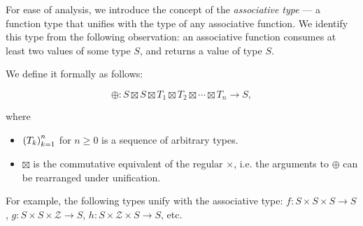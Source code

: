 For ease of analysis, we introduce the concept of the \emph{associative type}
--- a function type that unifies with the type of any associative function. We
identify this type from the following observation: an associative function
consumes at least two values of some type $S$, and returns a value of type $S$.

We define it formally as follows:

\[\oplus:S \boxtimes S \boxtimes T_1 \boxtimes T_2 \boxtimes \cdots \boxtimes
T_n \rightarrow S, \]

where

\begin{itemize}

\item $\left({T_k}\right)_{k=1}^n$ for $n\geq 0$ is a sequence of arbitrary types.

\item $\boxtimes$ is the commutative equivalent of the regular $\times$, i.e.
the arguments to $\oplus$ can be rearranged under unification.

\end{itemize}

For example, the following types unify with the associative type: $f:S \times S
\times S \rightarrow S$, $g:S \times S \times \mathcal{Z} \rightarrow S$, $h:S
\times \mathcal{Z} \times S \rightarrow S$, etc.
